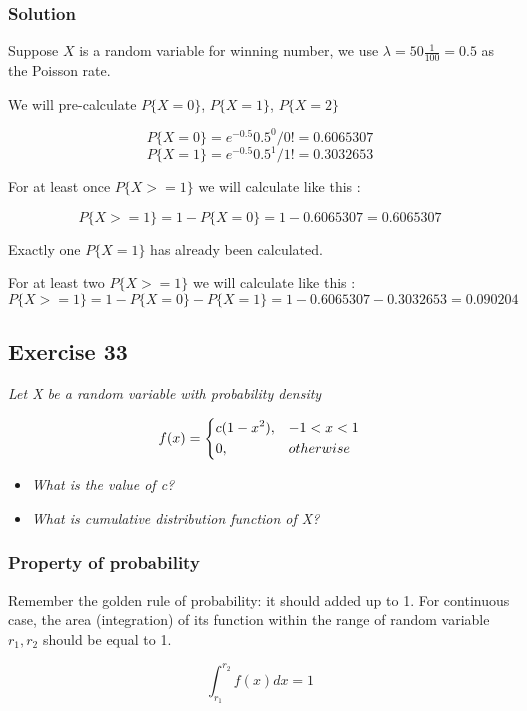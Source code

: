 \documentclass[12pt,a4paper]{article}
\begin{document}
\subsubsection{Solution}

Suppose $X$ is a random variable for winning number, we use $\lambda = 50 \frac{1}{100} = 0.5$ as the Poisson rate.

We will pre-calculate $P\{X=0\}$, $P\{X=1\}$, $P\{X=2\}$

\[
P\{X=0\} = e^{-0.5}{0.5}^{0}/0! = 0.6065307
\]
\[
P\{X=1\} = e^{-0.5}{0.5}^{1}/1! = 0.3032653
\]

For at least once $P\{X>=1\}$ we will calculate like this :

\[
P\{X>=1\} = 1 - P\{X=0\} = 1 - 0.6065307 = 0.6065307
\]

Exactly one $P\{X=1\}$ has already been calculated.

For at least two $P\{X>=1\}$ we will calculate like this :
\[
P\{X>=1\} = 1 - P\{X=0\} - P\{X=1\} = 1 - 0.6065307 - 0.3032653 = 0.090204
\]

\subsection{Exercise 33}

\textit{Let X be a random variable with probability density}

\[ f(x) = 
\begin{dcases}
	c(1-x^{2}), & -1 < x < 1 \\
	0, & otherwise
\end{dcases}
\]

\begin{itemize}
	\item \textit{What is the value of c?}
	\item \textit{What is cumulative distribution function of X?}
	
\end{itemize}

\subsubsection{Property of probability}

Remember the golden rule of probability: it should added up to 1. For continuous case, the area (integration) of its function within the range of random variable ${r_1, r_2}$ should be equal to 1.

\[
\int_{r_1}^{r_2} f(x) dx = 1
\]
\end{document}
